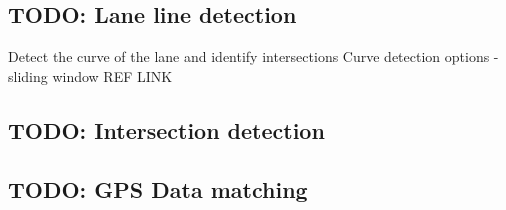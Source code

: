 \documentclass[]{aiaa-tc}%
\begin{document}
\subsection{TODO: Lane line detection}

Detect the curve of the lane and identify intersections
Curve detection options - sliding window REF LINK %

\subsection{TODO: Intersection detection}

\subsection{TODO: GPS Data matching}
\end{document}
